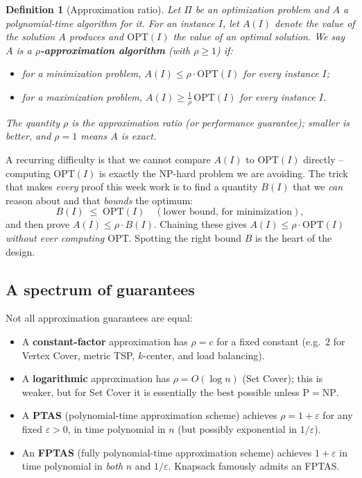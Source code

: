 \documentclass[11pt]{article}
\newtheorem{definition}[theorem]{Definition}
\begin{document}
\begin{definition}[Approximation ratio]
Let $\Pi$ be an optimization problem and $A$ a polynomial-time algorithm for it. For an
instance $I$, let $A(I)$ denote the value of the solution $A$ produces and
$\mathrm{OPT}(I)$ the value of an optimal solution. We say $A$ is a
\textbf{$\rho$-approximation algorithm} (with $\rho \ge 1$) if:
\begin{itemize}
    \item for a \emph{minimization} problem, $A(I) \le \rho \cdot \mathrm{OPT}(I)$ for
    every instance $I$;
    \item for a \emph{maximization} problem, $A(I) \ge \tfrac{1}{\rho}\,\mathrm{OPT}(I)$
    for every instance $I$.
\end{itemize}
The quantity $\rho$ is the \emph{approximation ratio} (or \emph{performance guarantee});
smaller is better, and $\rho = 1$ means $A$ is exact.
\end{definition}

A recurring difficulty is that we cannot compare $A(I)$ to $\mathrm{OPT}(I)$ directly --
computing $\mathrm{OPT}(I)$ is exactly the NP-hard problem we are avoiding. The trick that
makes \emph{every} proof this week work is to find a quantity $B(I)$ that we
\emph{can} reason about and that \emph{bounds} the optimum:
\[
    B(I) \;\le\; \mathrm{OPT}(I) \quad(\text{lower bound, for minimization}),
\]
and then prove $A(I) \le \rho \cdot B(I)$. Chaining these gives $A(I) \le \rho \cdot
\mathrm{OPT}(I)$ \emph{without ever computing $\mathrm{OPT}$}. Spotting the right bound
$B$ is the heart of the design.

\subsection{A spectrum of guarantees}

Not all approximation guarantees are equal:
\begin{itemize}
    \item A \textbf{constant-factor} approximation has $\rho = c$ for a fixed constant
    (e.g.\ $2$ for Vertex Cover, metric TSP, $k$-center, and load balancing).
    \item A \textbf{logarithmic} approximation has $\rho = O(\log n)$ (Set Cover); this is
    weaker, but for Set Cover it is essentially the best possible unless
    $\mathrm{P}=\mathrm{NP}$.
    \item A \textbf{PTAS} (polynomial-time approximation scheme) achieves $\rho = 1 +
    \varepsilon$ for any fixed $\varepsilon > 0$, in time polynomial in $n$ (but possibly
    exponential in $1/\varepsilon$).
    \item An \textbf{FPTAS} (fully polynomial-time approximation scheme) achieves $1 +
    \varepsilon$ in time polynomial in \emph{both} $n$ and $1/\varepsilon$. Knapsack
    famously admits an FPTAS.
\end{itemize}
\end{document}
